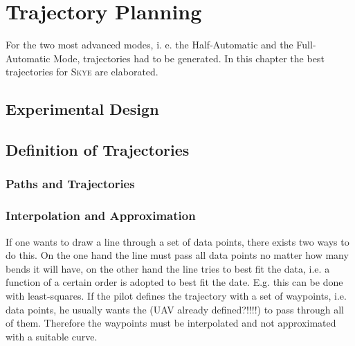 \chapter{Trajectory Planning}
\label{cha:trajectory}
For the two most advanced modes, i. e. the Half-Automatic and the Full-Automatic Mode, trajectories had to be generated. In this chapter the best trajectories for \textsc{Skye} are elaborated.



\section{Experimental Design}

\section{Definition of Trajectories}
\label{sec:definition}
\subsection{Paths and Trajectories}



\subsection{Interpolation and Approximation}
If one wants to draw a line through a set of data points, there exists two ways to do this. On the one hand the line must pass all data points no matter how many bends it will have, on the other hand the line tries to best fit the data, i.e. a function of a  certain order is adopted to best fit the date. E.g. this can be done with least-squares. If the pilot  defines the trajectory with a set of waypoints, i.e. data points, he usually wants the (UAV already defined?!!!!) to pass through all of them. Therefore the waypoints must be interpolated and not approximated with a suitable curve.

